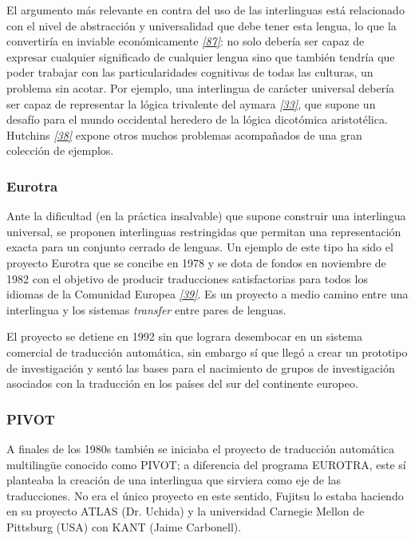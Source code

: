 \documentclass[a4paper,12pt,spanish]{book}
\begin{document}
El argumento más relevante en contra del uso de las interlinguas está relacionado con el nivel
de abstracción y universalidad que debe tener esta lengua, lo que la convertiría en inviable
económicamente \label{1.state-of-the-art/i.representacion-conocimiento:id38}{\hyperref[zreferences:martins2002]{\emph{{[}87{]}}}}: no solo debería ser capaz de expresar cualquier significado
de cualquier lengua sino que también tendría que poder trabajar con las particularidades
cognitivas de todas las culturas, un problema sin acotar. Por ejemplo, una interlingua de
carácter universal debería ser capaz de representar la lógica trivalente del
aymara \label{1.state-of-the-art/i.representacion-conocimiento:id39}{\hyperref[zreferences:rojas1985]{\emph{{[}33{]}}}}, que supone un desafío para el mundo occidental heredero de la
lógica dicotómica aristotélica.
Hutchins \label{1.state-of-the-art/i.representacion-conocimiento:id40}{\hyperref[zreferences:hutchins1992]{\emph{{[}38{]}}}} expone otros muchos problemas acompañados de una gran
colección de ejemplos.


\subsubsection{Eurotra}
\label{1.state-of-the-art/i.representacion-conocimiento:eurotra}
Ante la dificultad (en la práctica insalvable) que supone construir una interlingua universal,
se proponen interlinguas restringidas que permitan una representación exacta para un
conjunto cerrado de lenguas.
Un ejemplo de este tipo ha sido el proyecto Eurotra que se concibe en 1978 y se dota de fondos
en noviembre de 1982 con el objetivo de producir traducciones
satisfactorias para todos los idiomas de la Comunidad Europea \label{1.state-of-the-art/i.representacion-conocimiento:id41}{\hyperref[zreferences:hutchins1992a]{\emph{{[}39{]}}}}.
Es un proyecto a medio camino entre una interlingua y los
sistemas \emph{transfer} entre pares de lenguas.

El proyecto se detiene en 1992 sin que lograra desembocar en un sistema comercial de traducción
automática, sin embargo sí que llegó a crear un prototipo de investigación y sentó las
bases para el nacimiento de grupos de investigación asociados con la traducción en los
países del sur del continente europeo.


\subsubsection{PIVOT}
\label{1.state-of-the-art/i.representacion-conocimiento:pivot}
A finales de los 1980s también se iniciaba el proyecto de traducción automática multilingüe
conocido como PIVOT; a diferencia del programa EUROTRA, este sí planteaba la creación de una
interlingua que sirviera como eje de las traducciones.
No era el único proyecto en este sentido, Fujitsu lo estaba haciendo en su proyecto ATLAS
(Dr. Uchida) y la universidad Carnegie Mellon de Pittsburg (USA) con KANT (Jaime Carbonell).
\end{document}
